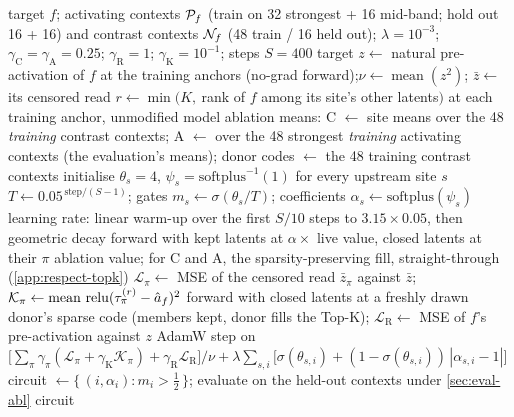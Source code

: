 \documentclass[10pt]{article}
\begin{document}
\begin{algorithm}
\caption{Weighted circuit masking, WCM[Z+C+A] with the resample term and rank-keep, as in the production run (one target $f$; \cref{tab:protocol})}
\label{alg:ablmask}
\begin{algorithmic}[1]
\Require target $f$; activating contexts $\mathcal{P}_f$ (train on 32 strongest + 16 mid-band; hold out 16 + 16) and contrast contexts $\mathcal{N}_f$ (48 train / 16 held out); $\lambda = 10^{-3}$; $\gamma_{\mathrm{C}} = \gamma_{\mathrm{A}} = 0.25$; $\gamma_{\mathrm{R}} = 1$; $\gamma_{\mathrm{K}} = 10^{-1}$; steps $S = 400$
\State target $z \gets$ natural pre-activation of $f$ at the training anchors (no-grad forward);\quad $\nu \gets \operatorname{mean}(z^2)$; \quad $\bar{z} \gets$ its censored read
\State $r \gets \min(K,\ $rank of $f$ among its site's other latents$)$ at each training anchor, unmodified model
\State ablation means: C $\gets$ site means over the 48 \emph{training} contrast contexts; A $\gets$ over the 48 strongest \emph{training} activating contexts (the evaluation's means); donor codes $\gets$ the 48 training contrast contexts
\State initialise $\theta_s = 4$, $\psi_s = \mathrm{softplus}^{-1}(1)$ for every upstream site $s$
    \State $T \gets 0.05^{\,\text{step}/(S - 1)}$; \quad gates $m_s \gets \sigma(\theta_s / T)$; \quad coefficients $\alpha_s \gets \mathrm{softplus}(\psi_s)$ 
    \State learning rate: linear warm-up over the first $S/10$ steps to $3.15 \times 0.05$, then geometric decay
     
        \State forward with kept latents at $\alpha \times$ live value, closed latents at their $\pi$ ablation value; for C and A, the sparsity-preserving fill, straight-through (\cref{app:respect-topk})
        \State $\mathcal{L}_{\pi} \gets$ MSE of the censored read $\bar{z}_{\pi}$ against $\bar{z}$; \quad $\mathcal{K}_{\pi} \gets \operatorname{mean}\,\operatorname{relu}(\tau^{(r)}_{\pi} - \hat{a}_f)^2$
    \EndFor
    \State forward with closed latents at a freshly drawn donor's sparse code (members kept, donor fills the Top-K); \quad $\mathcal{L}_{\mathrm{R}} \gets$ MSE of $f$'s pre-activation against $z$
    \State AdamW step on $\bigl[\sum_{\pi} \gamma_{\pi}(\mathcal{L}_{\pi} + \gamma_{\mathrm{K}}\mathcal{K}_{\pi}) + \gamma_{\mathrm{R}}\mathcal{L}_{\mathrm{R}}\bigr]/\nu + \lambda \sum_{s,i} \bigl[\sigma(\theta_{s,i}) + (1 - \sigma(\theta_{s,i}))\,|\alpha_{s,i} - 1|\bigr]$ 
\EndFor
\State circuit $\gets \{\,(i, \alpha_i) : m_i > \tfrac{1}{2}\,\}$; evaluate on the held-out contexts under \cref{sec:eval-abl}
\State \Return circuit
\end{algorithmic}
\end{algorithm}
\end{document}
